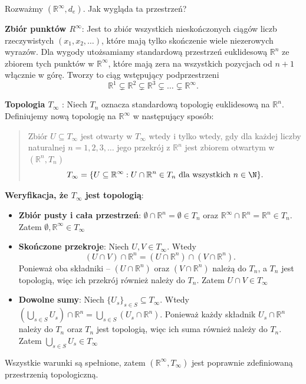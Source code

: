 \begin{eg}[1.2.2.]
	Rozważmy $\left( \mathbb{R}^{\infty}, d_{e} \right) $. Jak wygląda ta przestrzeń? 

	\noindent \textbf{Zbiór punktów $R^{\infty}$}: Jest to zbiór wszystkich nieskończonych ciągów liczb rzeczywistych $\left( x_1, x_2,\ldots \right) $, które mają tylko skończenie wiele niezerowych wyrazów. Dla wygody utożsamiamy standardową przestrzeń euklidesową $\mathbb{R}^{n}$ ze zbiorem tych punktów w $\mathbb{R}^{\infty}$, które mają zera na wszystkich pozycjach od  $n+1$ włącznie w górę. Tworzy to ciąg wstępujący podprzestrzeni 
	\[
	\mathbb{R}^{1} \subsetneq \mathbb{R}^{2}  \subsetneq \mathbb{R}^{3}  \subsetneq \ldots  \subsetneq \mathbb{R}^{\infty}
	.\] 

	\noindent\textbf{Topologia $T_{\infty}$} : Niech $T_{n}$ oznacza standardową topologię euklidesową na $\mathbb{R}^{n}$. Definiujemy nową topologię na $\mathbb{R}^{\infty}$ w następujący sposób:
	\begin{quote}
		Zbiór $U \subseteq T_{\infty}$ jest otwarty w $T_{\infty}$ wtedy i tylko wtedy, gdy dla każdej liczby naturalnej $n=1,2,3,\ldots$ jego przekrój z $\mathbb{R}^{n}$ jest zbiorem otwartym w $\left( \mathbb{R}^{n},T_{n} \right) $ 
		\[
		T_{\infty} = \{U \subseteq \mathbb{R}^{\infty}: U \cap \mathbb{R}^{n} \in T_{n} \text{ dla wszystkich } n\in \N \} 
		.\] 
	\end{quote} 
\noindent \textbf{Weryfikacja, że $T_{\infty}$ jest topologią}:
\begin{itemize}
	\item \textbf{Zbiór pusty i cała przestrzeń}: $\emptyset \cap \mathbb{R}^{n} = \emptyset \in T_{n} $ oraz $\mathbb{R}^{\infty}\cap \mathbb{R}^{n} = \mathbb{R}^{n} \in T_{n}$. Zatem $\emptyset, \mathbb{R}^{\infty} \in T_{\infty}$
	\item \textbf{Skończone przekroje}: Niech $U, V \in T_{\infty}$. Wtedy  
		\[
		\left( U\cap V \right) \cap \mathbb{R}^{n} = \left( U\cap \mathbb{R}^{n} \right) \cap \left( V \cap \mathbb{R}^{n} \right)
		.\] 
	Ponieważ oba składniki -- $\left( U\cap \mathbb{R}^{n} \right) $ oraz $\left( V\cap \mathbb{R}^{n} \right) $ należą do $T_{n}$, a $T_{n}$ jest topologią, więc ich przekrój również należy do $T_{n}$. Zatem $U\cap V \in T_{\infty}$
	\item \textbf{Dowolne sumy}: Niech $\{U_{s}\}_{s \in S} \subseteq T_{\infty}$. Wtedy $\left( \bigcup_{s \in S} U_{s} \right) \cap \mathbb{R}^{n} = \bigcup_{s \in S} \left( U_{s}\cap \mathbb{R}^{n} \right) $. Ponieważ każdy składnik $U_{s}\cap \mathbb{R}^{n}$ należy do $T_{n}$ oraz $T_{n}$ jest topologią, więc ich suma również należy do $T_{n}$. Zatem $\bigcup_{s \in S} U_{s} \in T_{\infty}$ 
\end{itemize}
Wszystkie warunki są spełnione, zatem $\left( \mathbb{R}^{\infty}, T_{\infty} \right) $ jest poprawnie zdefiniowaną przestrzenią topologiczną.


\end{eg}
